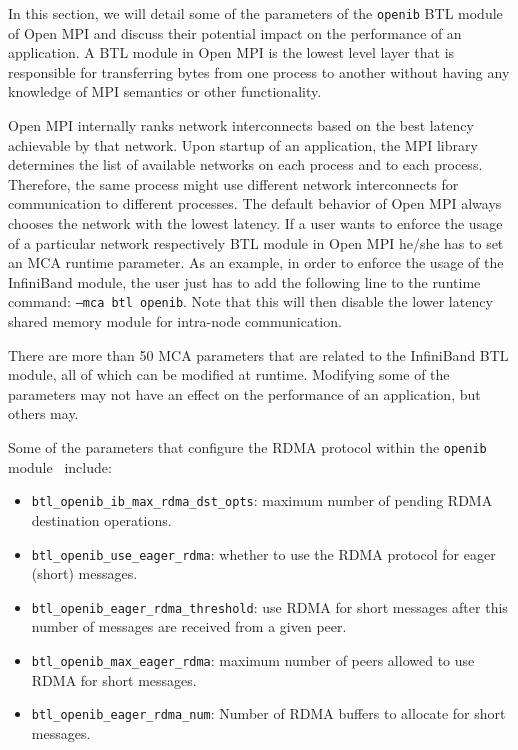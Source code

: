 \label{sec:motivation}

In this section, we will detail some of the parameters of the {\tt openib} BTL module of Open MPI and discuss their potential impact on the performance of an application.  A BTL module in Open MPI is the lowest level layer that is responsible for transferring bytes from one process to another without having any knowledge of MPI semantics or other functionality. 

Open MPI internally ranks network interconnects based on the best latency achievable by that network. Upon startup of an application, the MPI library determines the list of available networks on each process and to each process. Therefore, the same process might use different network interconnects for communication to different processes. The default behavior of Open MPI always chooses the network with the lowest latency. If a user wants to enforce the usage of a particular network respectively BTL module in Open MPI he/she has to set an MCA runtime parameter. As an example, in order to enforce the usage of the InfiniBand module, the user just has to add the following line to the runtime command: 
{\tt --mca btl openib}. Note that this will then disable the lower latency shared memory module for intra-node communication.

There are more than 50 MCA parameters that are related to the InfiniBand BTL
module, all of which can be modified at runtime. Modifying some of
the parameters may not have an effect on the performance of an application,
but others may. 

Some of the parameters that configure the RDMA protocol within the {\tt openib} module~\cite{rdma}
include:
\begin{itemize}
\item {\tt btl\_openib\_ib\_max\_rdma\_dst\_opts}: maximum number of pending
  RDMA destination operations.
\item {\tt btl\_openib\_use\_eager\_rdma}: whether to use the RDMA protocol for
  eager (short) messages.
\item {\tt btl\_openib\_eager\_rdma\_threshold}: use RDMA for short messages
  after this number of messages are received from a given peer.
\item {\tt btl\_openib\_max\_eager\_rdma}: maximum number of peers allowed to
  use RDMA for short messages.
\item {\tt btl\_openib\_eager\_rdma\_num}: Number of RDMA buffers to allocate
  for short messages.
\end{itemize}

